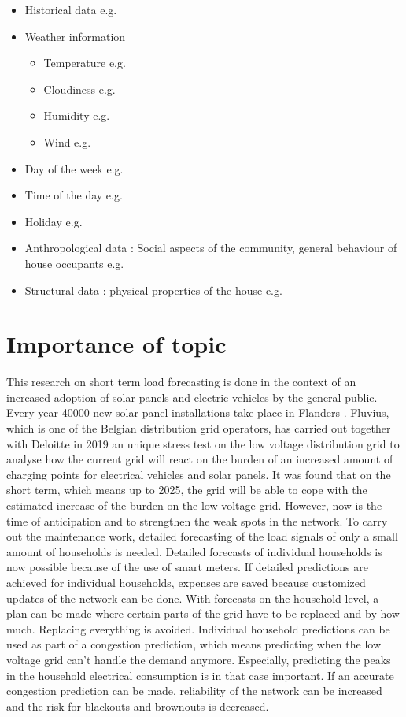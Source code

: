\begin{itemize}
	\item Historical data e.g. \cite{Kong2019}
	\item Weather information
	\begin{itemize}
		\item Temperature e.g. \cite{Kong2019}
		\item Cloudiness e.g. \cite{Contaxi2006}
		\item Humidity e.g. \cite{Contaxi2006}
		\item Wind e.g. \cite{Charytoniuk1997}
	\end{itemize}
	\item Day of the week e.g. \cite{Kong2019}
	\item Time of the day e.g. \cite{Kong2019}
	\item Holiday e.g. \cite{Kong2019}
	\item Anthropological data : Social aspects of the community, general behaviour of house
	occupants e.g. \cite{Javed2012}
	\item Structural data : physical properties of the house e.g. \cite{Javed2012}
\end{itemize}

\section{Importance of topic}
This research on short term load forecasting is done in the context of an increased adoption of solar panels and electric vehicles by the general public. Every year 40000 new solar panel installations take place in Flanders \cite{Lemmens2019}. Fluvius, which is one of the Belgian distribution grid operators, has carried out together with Deloitte in 2019 an unique stress test on the low voltage distribution grid to analyse how the current grid will react on the burden of an increased amount of charging points for electrical vehicles and solar panels. It was found that on the short term, which means up to 2025, the grid will be able to cope with the estimated increase of the burden on the low voltage grid. However, now is the time of anticipation and to strengthen the weak spots in the network. To carry out the maintenance work, detailed forecasting of the load signals of only a small amount of households is needed. Detailed forecasts of individual households is now possible because of the use of smart meters. If detailed predictions are achieved for individual households, expenses are saved because customized updates of the network can be done. With forecasts on the household level, a plan can be made where certain parts of the grid have to be replaced and by how much. Replacing everything is avoided. Individual household predictions can be used as part of a congestion prediction, which means predicting when the low voltage grid can't handle the demand anymore. Especially, predicting the peaks in the household electrical consumption is in that case important. If an accurate congestion prediction can be made, reliability of the network can be increased and the risk for blackouts and brownouts is decreased.\\

